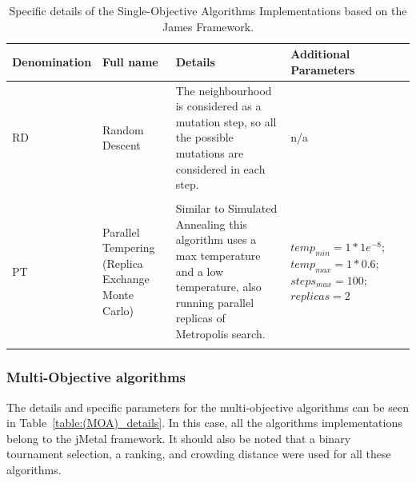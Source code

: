 \begin{table}[H]
    \begin{tabular}{p{}p{}p{}p{}p{}}
    \hline
    Denomination  & Full name & Details & Additional Parameters 
    \\
    \hline
    RD & Random Descent & The neighbourhood is considered as a mutation step, so all the possible mutations are considered in each step. & n/a \\ \\
    PT & Parallel Tempering (Replica Exchange Monte Carlo) & Similar to Simulated Annealing this algorithm uses a max temperature and a low temperature, also running parallel replicas of Metropolis search.& $temp_{min} = 1 * 1e^{-8}$;$temp_{max} = 1 * 0.6$; $steps_{max} = 100$; $replicas = 2$ \\ \\
    \hline
    \end{tabular}
    \caption{Specific details of the Single-Objective Algorithms Implementations based on the James Framework.}
    \label{table:(SOA)_details_james}
\end{table}

\subsubsection{Multi-Objective algorithms}

The details and specific parameters for the multi-objective algorithms can be seen in Table~\ref{table:(MOA)_details}. In this case, all the algorithms implementations belong to the jMetal framework. It should also be noted that a binary tournament selection, a ranking, and crowding distance were used for all these algorithms.

